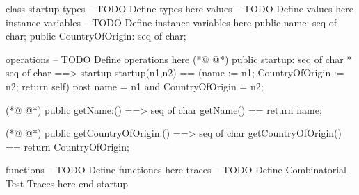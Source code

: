 \begin{vdmpp}[breaklines=true]
class startup
types
-- TODO Define types here
values
-- TODO Define values here
instance variables
-- TODO Define instance variables here
 public name: seq of char;
 public CountryOfOrigin: seq of char;

operations
-- TODO Define operations here
(*@
\label{startup:13}
@*)
 public startup: seq of char * seq of char ==> startup
 startup(n1,n2) == (name := n1; CountryOfOrigin := n2; return self)
 post name = n1 and CountryOfOrigin = n2;
 
(*@
\label{getName:17}
@*)
 public getName:() ==> seq of char
 getName() == return name;
 
(*@
\label{getCountryOfOrigin:20}
@*)
 public getCountryOfOrigin:() ==> seq of char
 getCountryOfOrigin() == return CountryOfOrigin;

functions
-- TODO Define functiones here
traces
-- TODO Define Combinatorial Test Traces here
end startup
\end{vdmpp}
